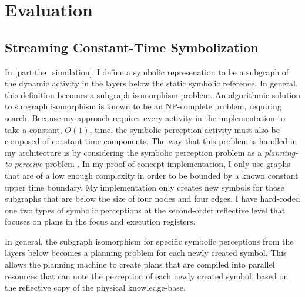 \chapter{Evaluation}
\label{chapter:evaulation}


\section{Streaming Constant-Time Symbolization}

In {\mbox{\autoref{part:the_simulation}}}, I define a symbolic
represenation to be a subgraph of the dynamic activity in the layers
below the static symbolic reference.  In general, this definition
becomes a subgraph isomorphism problem.  An algorithmic solution to
subgraph isomorphism is known to be an NP-complete problem, requiring
search.  Because my approach requires every activity in the
implementation to take a constant, $O(1)$, time, the symbolic
perception activity must also be composed of constant time components.
The way that this problem is handled in my architecture is by
considering the symbolic perception problem as a
\emph{planning-to-perceive} problem \cite[]{pryorcollins:1995}.  In my
proof-of-concept implementation, I only use graphs that are of a low
enough complexity in order to be bounded by a known constant upper
time boundary.  My implementation only creates new symbols for
those subgraphs that are below the size of four nodes and four edges.
I have hard-coded one two types of symbolic perceptions at the
second-order reflective level that focuses on plans in the focus and
execution registers.

In general, the subgraph isomorphism for specific symbolic perceptions
from the layers below becomes a planning problem for each newly
created symbol.  This allows the planning machine to create plans that
are compiled into parallel resources that can note the perception of
each newly created symbol, based on the reflective copy of the
physical knowledge-base.

